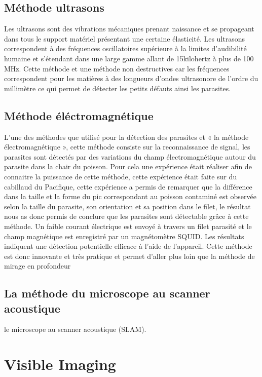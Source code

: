 \documentclass[12pt,a4paper]{article}
\begin{document}
\subsection{Méthode ultrasons}

Les ultrasons sont des vibrations mécaniques prenant naissance et se propageant dans tous le support matériel présentant une certaine élasticité.
Les ultrasons correspondent à des fréquences oscillatoires supérieure à la limites d’audibilité humaine et s’étendant dans une large gamme allant de 15kilohertz à plus de 100 MHz.
Cette méthode et une méthode non destructives car les fréquences correspondent pour les matières à des longueurs d’ondes ultrasonore de l’ordre du millimètre ce qui permet de détecter les petits défauts ainsi les parasites. 

\subsection{Méthode éléctromagnétique}

L’une des méthodes que utilisé pour la détection des parasites et  « la méthode électromagnétique », cette méthode consiste sur la reconnaissance de signal, les parasites sont détectés  par des variations du champ électromagnétique autour du parasite dans la chair du poisson.
Pour cela une expérience était réaliser afin de connaitre la puissance de cette méthode, cette expérience était faite sur du cabillaud du Pacifique, cette expérience a permis de remarquer que la différence dans la taille et la forme du pic correspondant au poisson contaminé est observée selon la taille du parasite, son orientation et sa position dans le filet, le résultat nous as donc permis  de conclure que les parasites sont détectable grâce à cette méthode. Un faible courant électrique est envoyé à travers un filet parasité et le champ magnétique est enregistré par un magnétomètre SQUID. Les résultats indiquent une détection potentielle efficace à l'aide de l'appareil.
Cette méthode est donc innovante et très pratique et permet d’aller plus loin que la méthode de mirage en profondeur



\subsection{La méthode du  microscope au scanner acoustique}
le microscope au scanner acoustique (SLAM).


\section{Visible Imaging}
\end{document}
